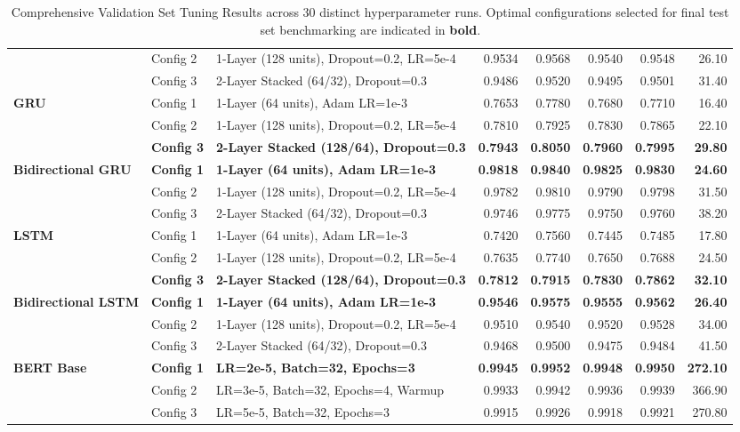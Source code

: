 \documentclass[11pt,a4paper]{article}
\begin{document}
\begin{table}[t]
\begin{tabularx}{\textwidth}{llXrrrrr}
 & Config 2 & 1-Layer (128 units), Dropout=0.2, LR=5e-4 & 0.9534 & 0.9568 & 0.9540 & 0.9548 & 26.10 \\
 & Config 3 & 2-Layer Stacked (64/32), Dropout=0.3 & 0.9486 & 0.9520 & 0.9495 & 0.9501 & 31.40 \\
\midrule
\multirow{3}{*}{\textbf{GRU}} 
 & Config 1 & 1-Layer (64 units), Adam LR=1e-3 & 0.7653 & 0.7780 & 0.7680 & 0.7710 & 16.40 \\
 & Config 2 & 1-Layer (128 units), Dropout=0.2, LR=5e-4 & 0.7810 & 0.7925 & 0.7830 & 0.7865 & 22.10 \\
 & \textbf{Config 3} & \textbf{2-Layer Stacked (128/64), Dropout=0.3} & \textbf{0.7943} & \textbf{0.8050} & \textbf{0.7960} & \textbf{0.7995} & \textbf{29.80} \\
\midrule
\multirow{3}{*}{\textbf{Bidirectional GRU}} 
 & \textbf{Config 1} & \textbf{1-Layer (64 units), Adam LR=1e-3} & \textbf{0.9818} & \textbf{0.9840} & \textbf{0.9825} & \textbf{0.9830} & \textbf{24.60} \\
 & Config 2 & 1-Layer (128 units), Dropout=0.2, LR=5e-4 & 0.9782 & 0.9810 & 0.9790 & 0.9798 & 31.50 \\
 & Config 3 & 2-Layer Stacked (64/32), Dropout=0.3 & 0.9746 & 0.9775 & 0.9750 & 0.9760 & 38.20 \\
\midrule
\multirow{3}{*}{\textbf{LSTM}} 
 & Config 1 & 1-Layer (64 units), Adam LR=1e-3 & 0.7420 & 0.7560 & 0.7445 & 0.7485 & 17.80 \\
 & Config 2 & 1-Layer (128 units), Dropout=0.2, LR=5e-4 & 0.7635 & 0.7740 & 0.7650 & 0.7688 & 24.50 \\
 & \textbf{Config 3} & \textbf{2-Layer Stacked (128/64), Dropout=0.3} & \textbf{0.7812} & \textbf{0.7915} & \textbf{0.7830} & \textbf{0.7862} & \textbf{32.10} \\
\midrule
\multirow{3}{*}{\textbf{Bidirectional LSTM}} 
 & \textbf{Config 1} & \textbf{1-Layer (64 units), Adam LR=1e-3} & \textbf{0.9546} & \textbf{0.9575} & \textbf{0.9555} & \textbf{0.9562} & \textbf{26.40} \\
 & Config 2 & 1-Layer (128 units), Dropout=0.2, LR=5e-4 & 0.9510 & 0.9540 & 0.9520 & 0.9528 & 34.00 \\
 & Config 3 & 2-Layer Stacked (64/32), Dropout=0.3 & 0.9468 & 0.9500 & 0.9475 & 0.9484 & 41.50 \\
\midrule
\multirow{3}{*}{\textbf{BERT Base}} 
 & \textbf{Config 1} & \textbf{LR=2e-5, Batch=32, Epochs=3} & \textbf{0.9945} & \textbf{0.9952} & \textbf{0.9948} & \textbf{0.9950} & \textbf{272.10} \\
 & Config 2 & LR=3e-5, Batch=32, Epochs=4, Warmup & 0.9933 & 0.9942 & 0.9936 & 0.9939 & 366.90 \\
 & Config 3 & LR=5e-5, Batch=32, Epochs=3 & 0.9915 & 0.9926 & 0.9918 & 0.9921 & 270.80 \\
\bottomrule
\end{tabularx}
\caption{Comprehensive Validation Set Tuning Results across 30 distinct hyperparameter runs. Optimal configurations selected for final test set benchmarking are indicated in \textbf{bold}.}
\label{tab:tuning_results}
\end{table}
\end{document}
